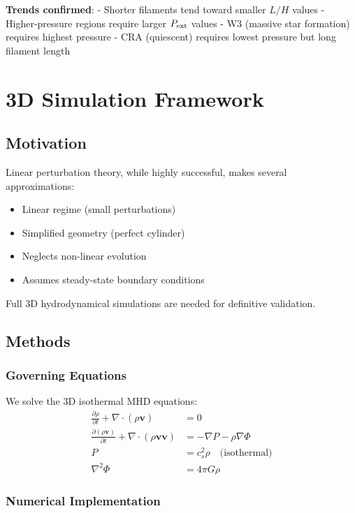 \documentclass[11pt,a4paper]{article}
\begin{document}
\textbf{Trends confirmed}:
- Shorter filaments tend toward smaller $L/H$ values
- Higher-pressure regions require larger $P_{\rm ext}$ values
- W3 (massive star formation) requires highest pressure
- CRA (quiescent) requires lowest pressure but long filament length

\section{3D Simulation Framework}

\subsection{Motivation}

Linear perturbation theory, while highly successful, makes several approximations:
\begin{itemize}
    \item Linear regime (small perturbations)
    \item Simplified geometry (perfect cylinder)
    \item Neglects non-linear evolution
    \item Assumes steady-state boundary conditions
\end{itemize}

Full 3D hydrodynamical simulations are needed for definitive validation.

\subsection{Methods}

\subsubsection{Governing Equations}

We solve the 3D isothermal MHD equations:
\begin{align}
\frac{\partial \rho}{\partial t} + \nabla \cdot (\rho \mathbf{v}) &= 0 \\
\frac{\partial (\rho \mathbf{v})}{\partial t} + \nabla \cdot (\rho \mathbf{v} \mathbf{v}) &= -\nabla P - \rho \nabla \Phi \\
P &= c_s^2 \rho \quad \text{(isothermal)} \\
\nabla^2 \Phi &= 4\pi G \rho
\end{align}

\subsubsection{Numerical Implementation}
\end{document}
